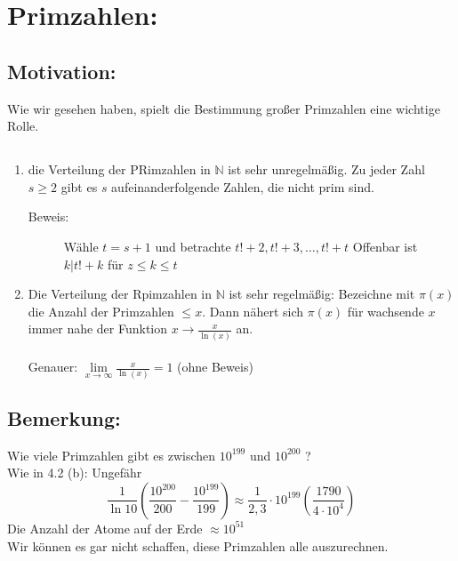 \section{Primzahlen:}
%
%
%
\subsection{Motivation:}
Wie wir gesehen haben, spielt die Bestimmung großer Primzahlen eine wichtige Rolle.
%
%
%
\subsection{\qquad}
  \begin{enumerate}[label={(\alph*)}]
	\item die Verteilung der PRimzahlen in $\mathbb{N}$ ist sehr unregelmäßig. Zu jeder Zahl $s\geq 2$ gibt es $s$ 			
		aufeinanderfolgende Zahlen, die nicht prim sind.
	\begin{description}
		\item [Beweis:] Wähle $t = s +1$ und betrachte $t!+2, t!+3, \dotsc, t!+t$ Offenbar ist $k|t!+k$ für $z \leq k \leq t$
	\end{description}
	\item Die Verteilung der Rpimzahlen in $\mathbb{N}$ ist sehr regelmäßig: Bezeichne mit $\pi(x)$  die Anzahl der Primzahlen 			$\leq x$. Dann nähert sich $\pi(x)$ für wachsende $x$ immer nahe der Funktion $x \rightarrow \frac{x}{\ln(x)}$ an. 		\\
		\qquad\\	
		Genauer: $\lim\limits_{x \to \infty} \frac{x}{\ln(x)} = 1$ (ohne Beweis)
\end{enumerate}
%
%
%
\subsection{Bemerkung:}
Wie viele Primzahlen gibt es zwischen $10^{199}$ und $10^{200}$ ?\\
Wie in 4.2 (b): Ungefähr 
\begin{equation*}
\frac{1}{\ln 10} (\frac{10^{200}}{200} - \frac{10^{199}}{199}) \approx \frac{1}{2,3}\cdot 10^{199}(\frac{1790}{4 \cdot 10^{4}})
\end{equation*}
Die Anzahl der Atome auf der Erde $\approx 10^{51}$ \\
Wir können es gar nicht schaffen, diese Primzahlen alle auszurechnen.
%
%
%
